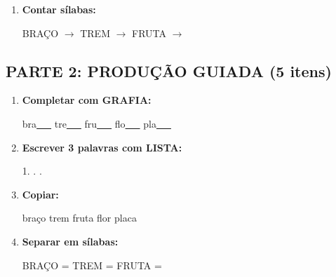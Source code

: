 \begin{exercicio}
\begin{enumerate}
  \item \textbf{Contar sílabas:}
  \begin{center}
  BRAÇO $\rightarrow$ \underline{\hspace{0.9cm}} \quad TREM $\rightarrow$ \underline{\hspace{0.9cm}} \quad FRUTA $\rightarrow$ \underline{\hspace{0.9cm}}
  \end{center}

\end{enumerate}

\subsection*{PARTE 2: PRODUÇÃO GUIADA (5 itens)}

\begin{enumerate}[resume]

  \item \textbf{Completar com GRAFIA:}
  \begin{center}
  bra\underline{~~~} \quad tre\underline{~~~} \quad fru\underline{~~~} \quad flo\underline{~~~} \quad pla\underline{~~~}
  \end{center}

  \item \textbf{Escrever 3 palavras com LISTA:}
  \begin{center}
  1. \underline{\hspace{3cm}} . \underline{\hspace{3cm}} . \underline{\hspace{3cm}}
  \end{center}

  \item \textbf{Copiar:}
  \begin{center}
  braço \quad trem \quad fruta \quad flor \quad placa
  \end{center}

  \item \textbf{Separar em sílabas:}
  \begin{center}
  BRAÇO = \underline{\hspace{1cm}} \underline{\hspace{1cm}} \quad TREM = \underline{\hspace{1cm}} \underline{\hspace{1cm}} \quad FRUTA = \underline{\hspace{1cm}} \underline{\hspace{1cm}}
  \end{center}


\end{enumerate}
\end{exercicio}
